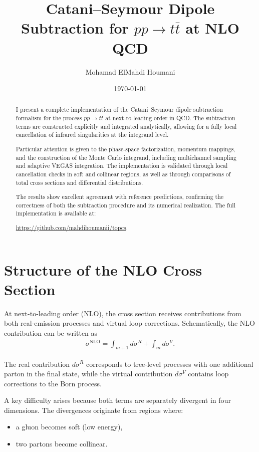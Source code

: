 \documentclass[11pt]{article}
\title{Catani--Seymour Dipole Subtraction for $pp \to t\bar{t}$ at NLO QCD}
\author{Mohamad ElMahdi Houmani}
\date{\today}
\begin{document}
\maketitle

\begin{abstract}
I present a complete implementation of the Catani--Seymour dipole subtraction
formalism for the process $pp \to t\bar{t}$ at next-to-leading order in QCD.
The subtraction terms are constructed explicitly and integrated analytically,
allowing for a fully local cancellation of infrared singularities at the
integrand level.

Particular attention is given to the phase-space factorization, momentum
mappings, and the construction of the Monte Carlo integrand, including
multichannel sampling and adaptive VEGAS integration. The implementation
is validated through local cancellation checks in soft and collinear regions,
as well as through comparisons of total cross sections and differential
distributions.

The results show excellent agreement with reference predictions, confirming
the correctness of both the subtraction procedure and its numerical realization.
The full implementation is available at:
\begin{center}    
\url{https://github.com/mahdihoumanii/topcs}.
\end{center}
\end{abstract}

\section{Structure of the NLO Cross Section}

At next-to-leading order (NLO), the cross section receives contributions
from both real-emission processes and virtual loop corrections.
Schematically, the NLO contribution can be written as
\begin{align}
\sigma^{\text{NLO}} =
\int_{m+1} d\sigma^R +
\int_m d\sigma^V.
\end{align}

The real contribution $d\sigma^R$ corresponds to tree-level processes
with one additional parton in the final state, while the virtual contribution
$d\sigma^V$ contains loop corrections to the Born process.

A key difficulty arises because both terms are separately divergent
in four dimensions. The divergences originate from regions where:
\begin{itemize}
    \item a gluon becomes soft (low energy),
    \item two partons become collinear.
\end{itemize}
\end{document}
